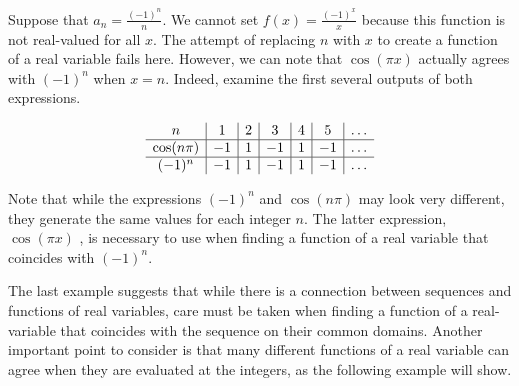 \documentclass{ximera}
\begin{document}
\begin{example}
Suppose that $a_n = \frac{(-1)^n}{n}$.  We cannot set $f(x) = \frac{(-1)^x}{x}$ because this function is not real-valued for all $x$.  The attempt of replacing $n$ with $x$ to create a function of a real variable fails here.  However, we can note that $\cos(\pi x)$ actually agrees with $(-1)^n$ when $x=n$.  Indeed, examine the first several outputs of both expressions.

\[
\begin{array}{c | c | c| c | c | c | c }
n & 1 & 2 & 3 & 4 & 5 & \ldots \\
\hline 
\cos(n \pi) & -1 & 1 & -1 & 1 & -1 &  \ldots \\
\hline
(-1)^n & -1 & 1 & -1 & 1 & -1 & \ldots
\end{array} 
\]
\end{example}

Note that while the expressions $(-1)^n$ and $\cos(n \pi)$ may look very different, they generate the same values for each integer $n$.  The latter expression, $\cos(\pi x)$ , is necessary to use when finding a function of a real variable that coincides with $(-1)^n$.

The last example suggests that while there is a connection between sequences and functions of real variables, care must be taken when finding a function of a real-variable that coincides with the sequence on their common domains.  Another important point to consider is that many different functions of a real variable can agree when they are evaluated at the integers, as the following example will show.
\end{document}
